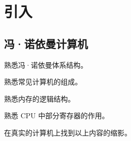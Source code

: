 
\part{引入}

\chapter{冯·诺依曼计算机}

\begin{introduction}
	\item 熟悉冯·诺依曼体系结构。
	\item 熟悉常见计算机的组成。
	\item 熟悉内存的逻辑结构。
	\item 熟悉 CPU 中部分寄存器的作用。
	\item 在真实的计算机上找到以上内容的缩影。
\end{introduction}
